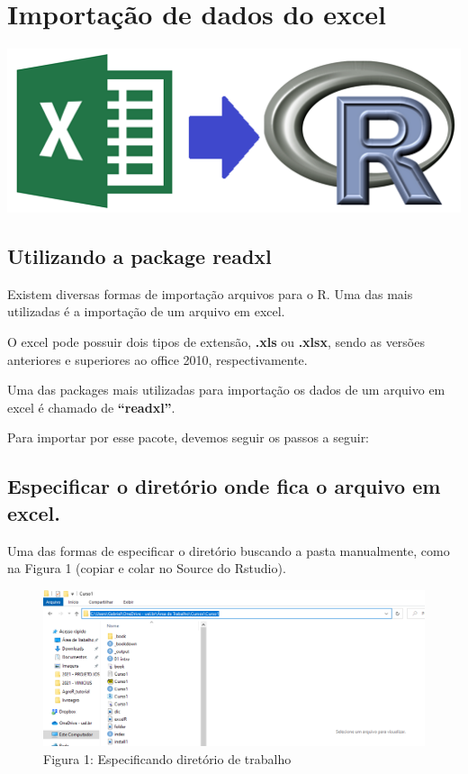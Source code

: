 \documentclass[
]{book}
\begin{document}
\hypertarget{importauxe7uxe3o-de-dados-do-excel}{%
\section{Importação de dados do excel}\label{importauxe7uxe3o-de-dados-do-excel}}

\href{}{\includegraphics{excelR.png}}

\hypertarget{utilizando-a-package-readxl}{%
\subsection{Utilizando a package readxl}\label{utilizando-a-package-readxl}}

Existem diversas formas de importação arquivos para o R. Uma das mais utilizadas é a importação de um arquivo em excel.

O excel pode possuir dois tipos de extensão, \textbf{.xls} ou \textbf{.xlsx}, sendo as versões anteriores e superiores ao office 2010, respectivamente.

Uma das packages mais utilizadas para importação os dados de um arquivo em excel é chamado de \textbf{``readxl''}.

Para importar por esse pacote, devemos seguir os passos a seguir:

\hypertarget{especificar-o-diretuxf3rio-onde-fica-o-arquivo-em-excel.}{%
\subsection{Especificar o diretório onde fica o arquivo em excel.}\label{especificar-o-diretuxf3rio-onde-fica-o-arquivo-em-excel.}}

Uma das formas de especificar o diretório buscando a pasta manualmente, como na Figura 1 (copiar e colar no Source do Rstudio).

\begin{figure}
\centering
\includegraphics{pasta.png}
\caption{Figura 1: Especificando diretório de trabalho}
\end{figure}
\end{document}
